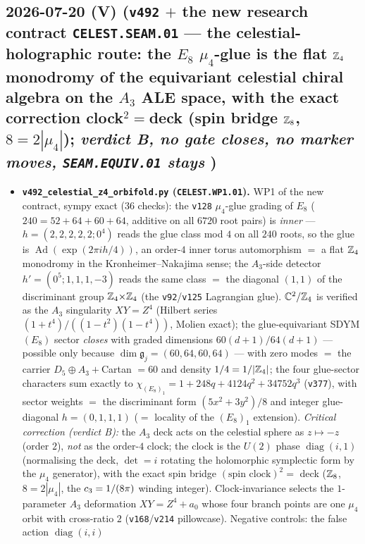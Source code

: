\subsection*{2026-07-20 (V) (\texttt{v492} $+$ the new research contract \texttt{CELEST.SEAM.01} --- the celestial-holographic route: the $E_8$ $\mu_4$-glue is the flat $\mathbb{Z}_4$ monodromy of the equivariant celestial chiral algebra on the $A_3$ ALE space, with the exact correction clock$^2{=}$deck (spin bridge $\mathbb{Z}_8$, $8{=}2|\mu_4|$); \emph{verdict B, no gate closes, no marker moves, \texttt{SEAM.EQUIV.01} stays \mO})}
\begin{itemize}[leftmargin=1.5em]
\item \textbf{\texttt{v492\_celestial\_z4\_orbifold.py} (\texttt{CELEST.WP1.01}).} WP1 of the new contract,
sympy exact (36 checks): the \texttt{v128} $\mu_4$-glue grading of $E_8$ ($240=52{+}64{+}60{+}64$, additive on
all $6720$ root pairs) is \emph{inner} --- $h=(2,2,2,2,2;0^4)$ reads the glue class mod $4$ on all $240$
roots, so the glue is $\operatorname{Ad}(\exp(2\pi ih/4))$, an order-$4$ inner torus automorphism $=$ a flat
$\mathbb{Z}_4$ monodromy in the Kronheimer--Nakajima sense; the $A_3$-side detector $h'=(0^5;1,1,1,-3)$ reads the same class $=$ the diagonal
$(1,1)$ of the discriminant group $\mathbb{Z}_4{\times}\mathbb{Z}_4$ (the \texttt{v92}/\texttt{v125} Lagrangian glue).
$\mathbb C^2/\mathbb{Z}_4$ is verified as the $A_3$ singularity $XY{=}Z^4$ (Hilbert series
$(1{+}t^4)/((1{-}t^2)(1{-}t^4))$, Molien exact); the glue-equivariant SDYM$(E_8)$ sector \emph{closes} with
graded dimensions $60(d{+}1)/64(d{+}1)$ --- possible only because $\dim\mathfrak g_j=(60,64,60,64)$ --- with
zero modes $=$ the carrier $D_5{\oplus}A_3{+}$Cartan $=60$ and density $1/4=1/|\mathbb{Z}_4|$; the four glue-sector
characters sum exactly to $\chi_{(E_8)_1}=1{+}248q{+}4124q^2{+}34752q^3$ (\texttt{v377}), with sector weights
$=$ the discriminant form $(5x^2{+}3y^2)/8$ and integer glue-diagonal $h=(0,1,1,1)$ ($=$ locality of the
$(E_8)_1$ extension). \emph{Critical correction (verdict B):} the $A_3$ deck acts on the celestial sphere as
$z\mapsto-z$ (order $2$), \emph{not} as the order-$4$ clock; the clock is the $U(2)$ phase
$\operatorname{diag}(i,1)$ (normalising the deck, $\det=i$ rotating the holomorphic symplectic form by the
$\mu_4$ generator), with the exact spin bridge $(\text{spin clock})^2=$ deck ($\mathbb{Z}_8$, $8=2|\mu_4|$, the
$c_3=1/(8\pi)$ winding integer). Clock-invariance selects the $1$-parameter $A_3$ deformation
$XY{=}Z^4{+}a_0$ whose four branch points are one $\mu_4$ orbit with cross-ratio $2$
(\texttt{v168}/\texttt{v214} pillowcase). Negative controls: the false action $\operatorname{diag}(i,i)$

\end{itemize}

